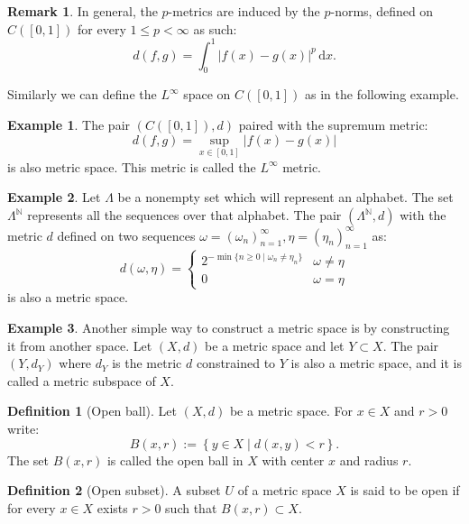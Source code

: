 \documentclass[11pt,a4paper]{article}
\theoremstyle{definition}
\newtheorem{definition}{Definition}[section]
\newtheorem{remark}{Remark}[section]
\newtheorem{example}{Example}[section]
\theoremstyle{plain}
\newcommand\dx    {\,\mathrm{d}x}
\newcommand{\N}{\mathbb{N}}
\newcommand{\set}[2]{ \left\{ #1 \mid #2 \right\} }
\newcommand{\abs}[1]{\left\lvert #1\right\rvert}
\begin{document}
  \begin{remark}
    In general, the $p$-metrics are induced by the $p$-norms, defined
    on $C\left([0,1]\right)$ for every $1 \le p < \infty$ as such:
    \[
      d(f,g) = \int_{0}^{1}{\abs{f(x) - g(x)}^p}\dx.
    \]
  \end{remark}
  Similarly we can define the $L^\infty$ space on $C\left([0,1]\right)$
  as in the following example.
  \begin{example}
  The pair $(C([0,1]), d)$ paired with the supremum metric:
  \[
    d(f,g) = \sup_{x \in [0,1]}{\abs{f(x) - g(x)}}
  \]
  is also metric space. This metric is called the $L^\infty$ metric.
  \end{example}
  
  \begin{example}
  Let $\Lambda$ be a nonempty set which will represent an alphabet.
  The set $\Lambda^{\N}$ represents all the sequences over that alphabet.
  The pair $(\Lambda^\N, d)$ with the metric $d$ defined on two sequences
  $\omega = (\omega_n)_{n=1}^{\infty}, \eta = (\eta_n)_{n=1}^{\infty}$
  as:
  \[
    d(\omega, \eta) = \begin{cases}
      2^{-\min\{n \geq 0 \mid \omega_n \neq \eta_n\}} & 
      \omega \neq \eta \\
      0 & \omega = \eta
    \end{cases}
  \]
  is also a metric space.
  \end{example}
  \begin{example}
    Another simple way to construct a metric space is by constructing it
    from another space. Let $(X,d)$ be a metric space and let $Y \subset X$.
    The pair $(Y,d_Y)$ where $d_Y$ is the metric $d$ constrained to $Y$
    is also a metric space, and it is called a metric subspace of $X$.
  \end{example}
  
  \begin{definition}[Open ball]
    Let $(X,d)$ be a metric space. For $x \in X$ and $r > 0$ write:
    \[
      B(x,r) := \set{y \in X}{d(x,y) < r}.
    \]
    The set $B(x,r)$ is called the open ball in $X$ with center $x$
    and radius $r$.
  \end{definition}
  
  \begin{definition}[Open subset]
    A subset $U$ of a metric space $X$ is said to be open if for every
    $x \in X$ exists $r > 0$ such that $B(x,r) \subset X$.
  \end{definition}
\end{document}
